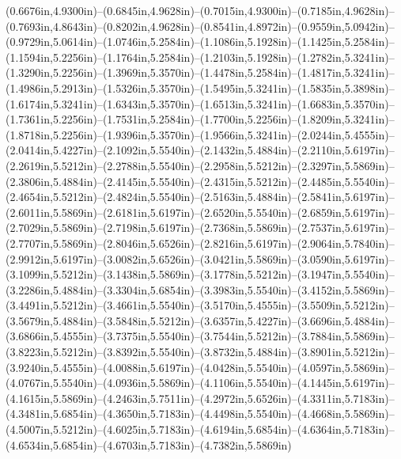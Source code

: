(0.6676in,4.9300in)--(0.6845in,4.9628in)--(0.7015in,4.9300in)--(0.7185in,4.9628in)--(0.7693in,4.8643in)--(0.8202in,4.9628in)--(0.8541in,4.8972in)--(0.9559in,5.0942in)--(0.9729in,5.0614in)--(1.0746in,5.2584in)--(1.1086in,5.1928in)--(1.1425in,5.2584in)--(1.1594in,5.2256in)--(1.1764in,5.2584in)--(1.2103in,5.1928in)--(1.2782in,5.3241in)--(1.3290in,5.2256in)--(1.3969in,5.3570in)--(1.4478in,5.2584in)--(1.4817in,5.3241in)--(1.4986in,5.2913in)--(1.5326in,5.3570in)--(1.5495in,5.3241in)--(1.5835in,5.3898in)--(1.6174in,5.3241in)--(1.6343in,5.3570in)--(1.6513in,5.3241in)--(1.6683in,5.3570in)--(1.7361in,5.2256in)--(1.7531in,5.2584in)--(1.7700in,5.2256in)--(1.8209in,5.3241in)--(1.8718in,5.2256in)--(1.9396in,5.3570in)--(1.9566in,5.3241in)--(2.0244in,5.4555in)--(2.0414in,5.4227in)--(2.1092in,5.5540in)--(2.1432in,5.4884in)--(2.2110in,5.6197in)--(2.2619in,5.5212in)--(2.2788in,5.5540in)--(2.2958in,5.5212in)--(2.3297in,5.5869in)--(2.3806in,5.4884in)--(2.4145in,5.5540in)--(2.4315in,5.5212in)--(2.4485in,5.5540in)--(2.4654in,5.5212in)--(2.4824in,5.5540in)--(2.5163in,5.4884in)--(2.5841in,5.6197in)--(2.6011in,5.5869in)--(2.6181in,5.6197in)--(2.6520in,5.5540in)--(2.6859in,5.6197in)--(2.7029in,5.5869in)--(2.7198in,5.6197in)--(2.7368in,5.5869in)--(2.7537in,5.6197in)--(2.7707in,5.5869in)--(2.8046in,5.6526in)--(2.8216in,5.6197in)--(2.9064in,5.7840in)--(2.9912in,5.6197in)--(3.0082in,5.6526in)--(3.0421in,5.5869in)--(3.0590in,5.6197in)--(3.1099in,5.5212in)--(3.1438in,5.5869in)--(3.1778in,5.5212in)--(3.1947in,5.5540in)--(3.2286in,5.4884in)--(3.3304in,5.6854in)--(3.3983in,5.5540in)--(3.4152in,5.5869in)--(3.4491in,5.5212in)--(3.4661in,5.5540in)--(3.5170in,5.4555in)--(3.5509in,5.5212in)--(3.5679in,5.4884in)--(3.5848in,5.5212in)--(3.6357in,5.4227in)--(3.6696in,5.4884in)--(3.6866in,5.4555in)--(3.7375in,5.5540in)--(3.7544in,5.5212in)--(3.7884in,5.5869in)--(3.8223in,5.5212in)--(3.8392in,5.5540in)--(3.8732in,5.4884in)--(3.8901in,5.5212in)--(3.9240in,5.4555in)--(4.0088in,5.6197in)--(4.0428in,5.5540in)--(4.0597in,5.5869in)--(4.0767in,5.5540in)--(4.0936in,5.5869in)--(4.1106in,5.5540in)--(4.1445in,5.6197in)--(4.1615in,5.5869in)--(4.2463in,5.7511in)--(4.2972in,5.6526in)--(4.3311in,5.7183in)--(4.3481in,5.6854in)--(4.3650in,5.7183in)--(4.4498in,5.5540in)--(4.4668in,5.5869in)--(4.5007in,5.5212in)--(4.6025in,5.7183in)--(4.6194in,5.6854in)--(4.6364in,5.7183in)--(4.6534in,5.6854in)--(4.6703in,5.7183in)--(4.7382in,5.5869in) 